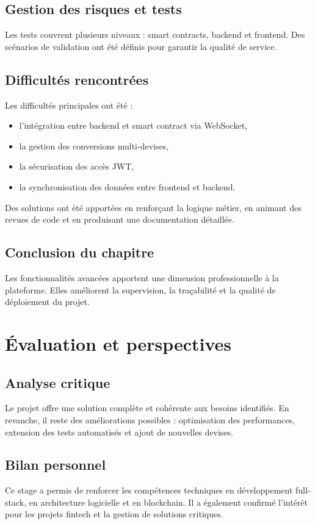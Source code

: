 \documentclass[a4paper,12pt]{report}
\begin{document}
\section{Gestion des risques et tests}
Les tests couvrent plusieurs niveaux : smart contracts, backend et frontend. Des scénarios de validation ont été définis pour garantir la qualité de service.

\section{Difficultés rencontrées}
Les difficultés principales ont été :
\begin{itemize}[leftmargin=*,nosep]
  \item l'intégration entre backend et smart contract via WebSocket,
  \item la gestion des conversions multi-devises,
  \item la sécurisation des accès JWT,
  \item la synchronisation des données entre frontend et backend.
\end{itemize}
Des solutions ont été apportées en renforçant la logique métier, en animant des revues de code et en produisant une documentation détaillée.

\section{Conclusion du chapitre}
Les fonctionnalités avancées apportent une dimension professionnelle à la plateforme. Elles améliorent la supervision, la traçabilité et la qualité de déploiement du projet.

\chapter{Évaluation et perspectives}
\section{Analyse critique}
Le projet offre une solution complète et cohérente aux besoins identifiés. En revanche, il reste des améliorations possibles : optimisation des performances, extension des tests automatisés et ajout de nouvelles devises.

\section{Bilan personnel}
Ce stage a permis de renforcer les compétences techniques en développement full-stack, en architecture logicielle et en blockchain. Il a également confirmé l'intérêt pour les projets fintech et la gestion de solutions critiques.
\end{document}
